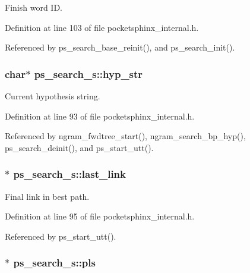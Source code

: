 Finish word I\-D. 



Definition at line 103 of file pocketsphinx\-\_\-internal.\-h.



Referenced by ps\-\_\-search\-\_\-base\-\_\-reinit(), and ps\-\_\-search\-\_\-init().

\subsubsection[{hyp\-\_\-str}]{\setlength{\rightskip}{0pt plus 5cm}char$\ast$ ps\-\_\-search\-\_\-s\-::hyp\-\_\-str}\label{structps__search__s_aa398c736a887af97e42b2a562359adc3}


Current hypothesis string. 



Definition at line 93 of file pocketsphinx\-\_\-internal.\-h.



Referenced by ngram\-\_\-fwdtree\-\_\-start(), ngram\-\_\-search\-\_\-bp\-\_\-hyp(), ps\-\_\-search\-\_\-deinit(), and ps\-\_\-start\-\_\-utt().

\subsubsection[{last\-\_\-link}]{$\ast$ ps\-\_\-search\-\_\-s\-::last\-\_\-link}\label{structps__search__s_aa3020ef7bd4e56713dfe2fbad52e6e4f}


Final link in best path. 



Definition at line 95 of file pocketsphinx\-\_\-internal.\-h.



Referenced by ps\-\_\-start\-\_\-utt().

\subsubsection[{pls}]{$\ast$ ps\-\_\-search\-\_\-s\-::pls}\label{structps__search__s_a2a33b7698fb237b42e007788f65cd46c}


